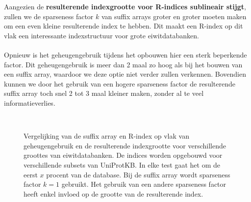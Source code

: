 Aangezien de \textbf{resulterende indexgrootte voor R-indices sublineair stijgt}, zullen we de sparseness factor $k$ van suffix arrays groter en groter moeten maken om een even kleine resulterende index te hebben.
Dit maakt een R-index op dit vlak een interessante indexstructuur voor grote eiwitdatabanken.
\\ \\
Opnieuw is het geheugengebruik tijdens het opbouwen hier een sterk beperkende factor.
Dit geheugengebruik is meer dan 2 maal zo hoog als bij het bouwen van een suffix array, waardoor we deze optie niet verder zullen verkennen.
Bovendien kunnen we door het gebruik van een hogere sparseness factor de resulterende suffix array toch snel 2 tot 3 maal kleiner maken, zonder al te veel informatieverlies.

\begin{figure}[H]
    \centering
    \\[4ex] %

    \caption{Vergelijking van de suffix array en R-index op vlak van geheugengebruik en de resulterende indexgrootte voor verschillende groottes van eiwitdatabanken. De indices worden opgebouwd voor verschillende subsets van UniProtKB. In elke test gaat het om de eerst $x$ procent van de database. Bij de suffix array wordt sparseness factor $k = 1$ gebruikt. Het gebruik van een andere sparseness factor heeft enkel invloed op de grootte van de resulterende index.}\label{fig:sa_vs_r_index}
\end{figure}


